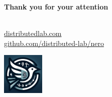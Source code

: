 \documentclass{zkdl-presentation-template}
\begin{document}
    \begin{frame}
        \centering
        \LARGE
        \textbf{Thank you for your attention} \\
        
        \vspace{0.2cm} \Huge {} \large \\
        
        \vspace{1cm}
  
        \href{https://distributedlab.com/}{\hspace{.325em}distributedlab.com} \\
  
        \href{https://github.com/distributed-lab/nero}{\hspace{.325em}github.com/distributed-lab/nero}
        
        \begin{center}
            \includegraphics[width=0.15\textwidth]{icon.png}
        \end{center}
    \end{frame}
\end{document}

